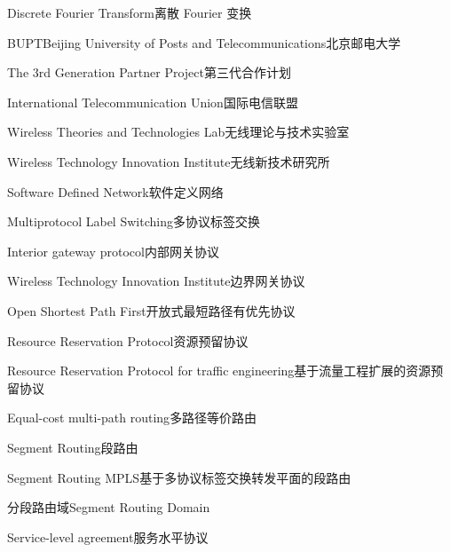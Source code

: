 

{Discrete Fourier Transform}{离散 Fourier 变换}

{BUPT}{Beijing University of Posts and Telecommunications}{北京邮电大学}

{The 3rd Generation Partner Project}{第三代合作计划}

{International Telecommunication Union}{国际电信联盟}

{Wireless Theories and Technologies Lab}{无线理论与技术实验室}

{Wireless Technology Innovation Institute}{无线新技术研究所}

{Software Defined Network}{软件定义网络}

{Multiprotocol Label Switching}{多协议标签交换}

{Interior gateway protocol}{内部网关协议}

{Wireless Technology Innovation Institute}{边界网关协议}

{Open Shortest Path First}{开放式最短路径有优先协议}

{Resource Reservation Protocol}{资源预留协议}

{Resource Reservation Protocol for traffic engineering}{基于流量工程扩展的资源预留协议}

{Equal-cost multi-path routing}{多路径等价路由}

{Segment Routing}{段路由}

{Segment Routing MPLS}{基于多协议标签交换转发平面的段路由}

{分段路由域}{Segment Routing Domain}

{Service-level agreement}{服务水平协议}

